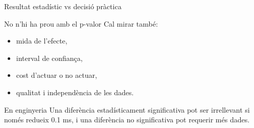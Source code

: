 \documentclass[10pt,aspectratio=169]{beamer}
\begin{document}
\begin{frame}[fragile]{Resultat estadístic vs decisió pràctica}
\begin{block}{No n'hi ha prou amb el p-valor}
Cal mirar també:
\begin{itemize}
  \item mida de l'efecte,
  \item interval de confiança,
  \item cost d'actuar o no actuar,
  \item qualitat i independència de les dades.
\end{itemize}
\end{block}
\begin{alertblock}{En enginyeria}
Una diferència estadísticament significativa pot ser irrellevant si només redueix 0.1 ms, i una diferència no significativa pot requerir més dades.
\end{alertblock}
\end{frame}
\end{document}
